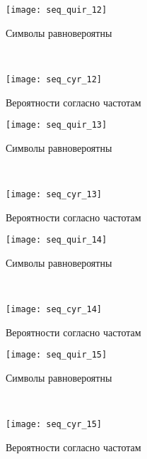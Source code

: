 \begin{figure}[H]
\begin{center}
	\begin{subfigure}[b]{0.45\textwidth}
		\texttt{[image: seq\_quir\_12]}
		\caption{Символы равновероятны}
	\end{subfigure}
	~
	\begin{subfigure}[b]{0.45\textwidth}
		\texttt{[image: seq\_cyr\_12]}
		\caption{Вероятности согласно частотам}
	\end{subfigure}
	\caption{}
\end{center}
\end{figure}

\begin{figure}[H]
\begin{center}
	\begin{subfigure}[b]{0.45\textwidth}
		\texttt{[image: seq\_quir\_13]}
		\caption{Символы равновероятны}
	\end{subfigure}
	~
	\begin{subfigure}[b]{0.45\textwidth}
		\texttt{[image: seq\_cyr\_13]}
		\caption{Вероятности согласно частотам}
	\end{subfigure}
	\caption{}
\end{center}
\end{figure}

\begin{figure}[H]
\begin{center}
	\begin{subfigure}[b]{0.45\textwidth}
		\texttt{[image: seq\_quir\_14]}
		\caption{Символы равновероятны}
	\end{subfigure}
	~
	\begin{subfigure}[b]{0.45\textwidth}
		\texttt{[image: seq\_cyr\_14]}
		\caption{Вероятности согласно частотам}
	\end{subfigure}
	\caption{}
\end{center}
\end{figure}

\begin{figure}[H]
\begin{center}
	\begin{subfigure}[b]{0.45\textwidth}
		\texttt{[image: seq\_quir\_15]}
		\caption{Символы равновероятны}
	\end{subfigure}
	~
	\begin{subfigure}[b]{0.45\textwidth}
		\texttt{[image: seq\_cyr\_15]}
		\caption{Вероятности согласно частотам}
	\end{subfigure}
	\caption{}
\end{center}
\end{figure}

